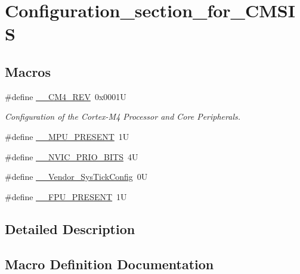 \hypertarget{group___configuration__section__for___c_m_s_i_s}{}\section{Configuration\+\_\+section\+\_\+for\+\_\+\+C\+M\+S\+IS}
\label{group___configuration__section__for___c_m_s_i_s}
\subsection*{Macros}
\begin{DoxyCompactItemize}
\item 
\#define \hyperlink{group___configuration__section__for___c_m_s_i_s_ga45a97e4bb8b6ce7c334acc5f45ace3ba}{\+\_\+\+\_\+\+C\+M4\+\_\+\+R\+EV}~0x0001U
\begin{DoxyCompactList}\small\item\em Configuration of the Cortex-\/\+M4 Processor and Core Peripherals. \end{DoxyCompactList}\item 
\#define \hyperlink{group___configuration__section__for___c_m_s_i_s_ga4127d1b31aaf336fab3d7329d117f448}{\+\_\+\+\_\+\+M\+P\+U\+\_\+\+P\+R\+E\+S\+E\+NT}~1U
\item 
\#define \hyperlink{group___configuration__section__for___c_m_s_i_s_gae3fe3587d5100c787e02102ce3944460}{\+\_\+\+\_\+\+N\+V\+I\+C\+\_\+\+P\+R\+I\+O\+\_\+\+B\+I\+TS}~4U
\item 
\#define \hyperlink{group___configuration__section__for___c_m_s_i_s_gab58771b4ec03f9bdddc84770f7c95c68}{\+\_\+\+\_\+\+Vendor\+\_\+\+Sys\+Tick\+Config}~0U
\item 
\#define \hyperlink{group___configuration__section__for___c_m_s_i_s_gac1ba8a48ca926bddc88be9bfd7d42641}{\+\_\+\+\_\+\+F\+P\+U\+\_\+\+P\+R\+E\+S\+E\+NT}~1U
\end{DoxyCompactItemize}


\subsection{Detailed Description}


\subsection{Macro Definition Documentation}
\mbox{\label{group___configuration__section__for___c_m_s_i_s_ga45a97e4bb8b6ce7c334acc5f45ace3ba}} 
